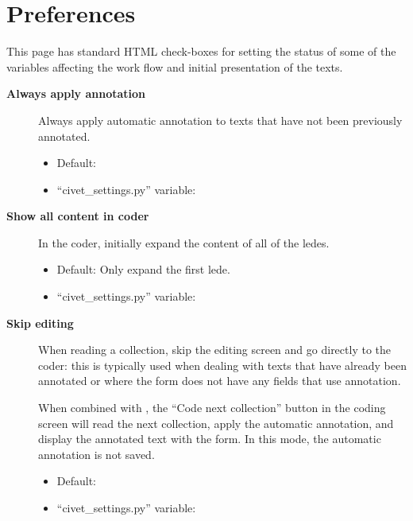 \documentclass[letterpaper,10pt,english]{sphinxmanual}
\begin{document}
\chapter{Preferences}
\label{preferences::doc}\label{preferences:preferences}
This page has standard HTML check-boxes for setting the status of some of the
variables affecting the work flow and initial presentation of the texts.
\begin{description}
\item[{\textbf{Always apply annotation}}] \leavevmode
Always apply automatic annotation to texts that have not been previously
annotated.
\begin{itemize}
\item {} 
Default: 

\item {} 
“civet\_settings.py” variable: 

\end{itemize}

\item[{\textbf{Show all content in coder}}] \leavevmode
In the coder, initially expand the content of all of the ledes.
\begin{itemize}
\item {} 
Default: Only expand the first lede.

\item {} 
“civet\_settings.py” variable: 

\end{itemize}

\item[{\textbf{Skip editing}}] \leavevmode
When reading a collection, skip the editing screen and go directly to the
coder: this is typically used when dealing with texts that have already
been annotated or where the form does not have any fields that use
annotation.

When combined with , the
“Code next collection” button in the coding screen will read the next
collection, apply the automatic annotation, and display the annotated
text with the form. In this mode, the automatic annotation is not
saved.
\begin{itemize}
\item {} 
Default: 

\item {} 
“civet\_settings.py” variable: 

\end{itemize}


\end{description}
\end{document}
